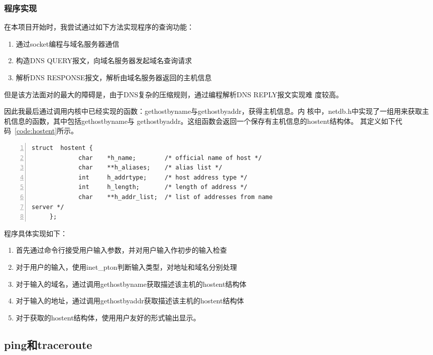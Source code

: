 \documentclass[a4paper,twoside]{ctexrep}
\begin{document}
\begin{spacing}{1.2}
\subsubsection{程序实现}

在本项目开始时，我尝试通过如下方法实现程序的查询功能：
\begin{enumerate}
	\item 通过socket编程与域名服务器通信
	\item 构造DNS QUERY报文，向域名服务器发起域名查询请求
	\item 解析DNS RESPONSE报文，解析由域名服务器返回的主机信息
\end{enumerate}

但是该方法⾯对的最大的障碍是，由于DNS复杂的压缩规则，通过编程解析DNS REPLY报文实现难
度较⾼。

因此我最后通过调用内核中已经实现的函数：gethostbyname与gethostbyaddr，获得主机信息。内
核中，netdb.h中实现了一组用来获取主机信息的函数，其中包括gethostbyname与
gethostbyaddr。这组函数会返回一个保存有主机信息的hostent结构体。
其定义如下代码~\ref{code:hostent}所示。

\begin{lstlisting}[numbers=left,style=CppStyle,caption={hostent结构体定义},label={code:hostent}]
	struct  hostent { 
             char    *h_name;        /* official name of host */ 
             char    **h_aliases;    /* alias list */ 
             int     h_addrtype;     /* host address type */ 
             int     h_length;       /* length of address */ 
             char    **h_addr_list;  /* list of addresses from name 
server */ 
     }; 
\end{lstlisting}
   
程序具体实现如下：
\begin{enumerate}
	\item 首先通过命令行接受用户输入参数，并对用户输入作初步的输入检查
	\item 对于用户的输入，使用inet\_pton判断输入类型，对地址和域名分别处理
	\item 对于输入的域名，通过调用gethostbyname获取描述该主机的hostent结构体
	\item 对于输入的地址，通过调用gethostbyaddr获取描述该主机的hostent结构体
	\item 对于获取的hostent结构体，使用用户友好的形式输出显示。
\end{enumerate}


\subsection{ping和traceroute}


\end{spacing}
\end{document}
